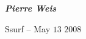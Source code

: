\documentclass[landscape]{slides}
\begin{document}

\vspace*{2cm}

\begin{center}

{\large \bf \em Pierre Weis}

\vspace*{3cm}

Ssurf -- May $13$ $2008$

\end{center}


\end{document}
